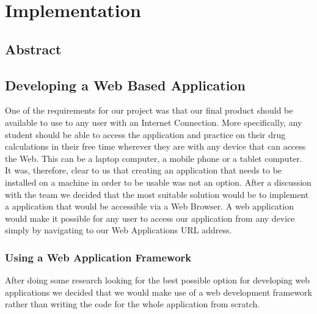 \documentclass{l3proj}
\begin{document}
\chapter{Implementation}
\label{implementation}
\section{Abstract}
\section{Developing a Web Based Application }
One of the requirements for our project was that our final product should be available to 
use to any user with an Internet Connection. More specifically, any student should be 
able to access the application and practice on their drug calculations in their free time 
wherever they are with any device that can access the Web. This can be a laptop 
computer, a mobile phone or a tablet computer. \\ 
It was, therefore, clear to us that creating an application that needs to be installed on a 
machine in order to be usable was not an option. After a discussion with the team we 
decided that the most suitable solution would be to implement a application that would be 
accessible via a Web Browser. A web application would make it possible for any user to 
access our application from any device simply by navigating to our Web Applications 
URL address. \\ 

\subsection {Using a Web Application Framework}
After doing some research looking for the best possible option for developing web 
applications we decided that we would make use of a web development framework 
rather than writing the code for the whole application from scratch.
\end{document}
